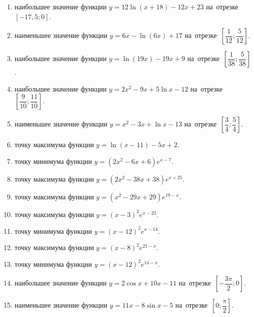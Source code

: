 \documentclass[a4paper,10pt]{article}
\begin{document}
\begin{enumerate}
\item {} наибольшее значение функции $y = 12\ln \left(x+18\right)-12x +23$ на~отрезке~$\left[-17,5;0\right]$.

\item {} наименьшее значение функции $y = 6x-\ln \left(6x\right)+17$ на~отрезке~$\left[\dfrac{1}{12};\dfrac{5}{12}\right]$.

\item {} наибольшее значение функции $y = \ln \left(19x\right)-19x+9$ на~отрезке~$\left[\dfrac{1}{38};\dfrac{5}{38}\right]$.

\item {} наибольшее значение функции $y=2x^2-9x+5\ln x-12$ на~отрезке~$\left[\dfrac{9}{10};\dfrac{11}{10}\right]$.

\item {} наименьшее значение функции $y=x^2-3x+\ln x-13$ на~отрезке~$\left[\dfrac{3}{4};\dfrac{5}{4}\right]$.

\item {} точку максимума функции $y=\ln \left(x-11\right)-5x+2$.

\item {} точку минимума функции $y=\left(2x^2-6x+6\right)e^{x-7}$.

\item {} точку максимума функции $y=\left(2x^2-38x+38\right)e^{x+25}$.

\item {} точку максимума функции $y=\left(x^2-29x+29\right)e^{19-x}$.

\item {} точку максимума функции $y=\left(x -3\right)^2e^{x-23}$.

\item {} точку минимума функции $y=\left(x -12\right)^2e^{x-14}$.

\item {} точку максимума функции $y=\left(x -8\right)^2e^{21-x}$.

\item {} точку минимума функции $y=\left(x -12\right)^2e^{14-x}$.

\item {} наибольшее значение функции $y=2\cos x+10x -11$ на~отрезке~$\left[-\dfrac{3\pi }{2};0\right]$.

\item {} наименьшее значение функции $y=11x-8\sin x -5$ на~отрезке~$\left[0;\dfrac{\pi }{2}\right]$.


\end{enumerate}
\end{document}
